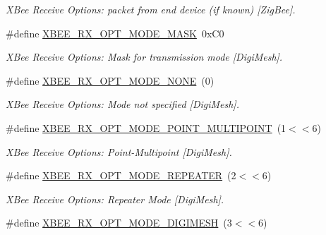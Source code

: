 \begin{DoxyCompactItemize}
\begin{DoxyCompactList}\small\item\em X\-Bee Receive Options\-: packet from end device (if known) \mbox{[}Zig\-Bee\mbox{]}. \end{DoxyCompactList}\item 
\hypertarget{group__xbee__device_ga79f154b39bb259ad7898783eebd1242c}{\#define \hyperlink{group__xbee__device_ga79f154b39bb259ad7898783eebd1242c}{X\-B\-E\-E\-\_\-\-R\-X\-\_\-\-O\-P\-T\-\_\-\-M\-O\-D\-E\-\_\-\-M\-A\-S\-K}~0x\-C0}\label{group__xbee__device_ga79f154b39bb259ad7898783eebd1242c}

\begin{DoxyCompactList}\small\item\em X\-Bee Receive Options\-: Mask for transmission mode \mbox{[}Digi\-Mesh\mbox{]}. \end{DoxyCompactList}\item 
\hypertarget{group__xbee__device_gaad601da5df374a25c456fbc3df93a253}{\#define \hyperlink{group__xbee__device_gaad601da5df374a25c456fbc3df93a253}{X\-B\-E\-E\-\_\-\-R\-X\-\_\-\-O\-P\-T\-\_\-\-M\-O\-D\-E\-\_\-\-N\-O\-N\-E}~(0)}\label{group__xbee__device_gaad601da5df374a25c456fbc3df93a253}

\begin{DoxyCompactList}\small\item\em X\-Bee Receive Options\-: Mode not specified \mbox{[}Digi\-Mesh\mbox{]}. \end{DoxyCompactList}\item 
\hypertarget{group__xbee__device_ga6465ba8e665a2614ee4479608c2ac3fc}{\#define \hyperlink{group__xbee__device_ga6465ba8e665a2614ee4479608c2ac3fc}{X\-B\-E\-E\-\_\-\-R\-X\-\_\-\-O\-P\-T\-\_\-\-M\-O\-D\-E\-\_\-\-P\-O\-I\-N\-T\-\_\-\-M\-U\-L\-T\-I\-P\-O\-I\-N\-T}~(1$<$$<$6)}\label{group__xbee__device_ga6465ba8e665a2614ee4479608c2ac3fc}

\begin{DoxyCompactList}\small\item\em X\-Bee Receive Options\-: Point-\/\-Multipoint \mbox{[}Digi\-Mesh\mbox{]}. \end{DoxyCompactList}\item 
\hypertarget{group__xbee__device_ga93f4b2a84bb3d00a3bfaa1b2c3497c2e}{\#define \hyperlink{group__xbee__device_ga93f4b2a84bb3d00a3bfaa1b2c3497c2e}{X\-B\-E\-E\-\_\-\-R\-X\-\_\-\-O\-P\-T\-\_\-\-M\-O\-D\-E\-\_\-\-R\-E\-P\-E\-A\-T\-E\-R}~(2$<$$<$6)}\label{group__xbee__device_ga93f4b2a84bb3d00a3bfaa1b2c3497c2e}

\begin{DoxyCompactList}\small\item\em X\-Bee Receive Options\-: Repeater Mode \mbox{[}Digi\-Mesh\mbox{]}. \end{DoxyCompactList}\item 
\hypertarget{group__xbee__device_ga052c6bbe1695b3cbf9f75fe7bbcaa1d5}{\#define \hyperlink{group__xbee__device_ga052c6bbe1695b3cbf9f75fe7bbcaa1d5}{X\-B\-E\-E\-\_\-\-R\-X\-\_\-\-O\-P\-T\-\_\-\-M\-O\-D\-E\-\_\-\-D\-I\-G\-I\-M\-E\-S\-H}~(3$<$$<$6)}\label{group__xbee__device_ga052c6bbe1695b3cbf9f75fe7bbcaa1d5}


\end{DoxyCompactItemize}
